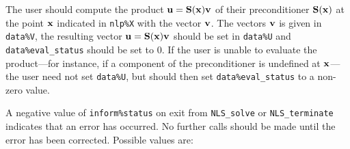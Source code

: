 \documentclass{galahad}
\newcommand{\packagename}{NLS}
\begin{document}
\begin{description}
 The user should compute the product ${\mathbf{u}} = {\mathbf{S}}({\mathbf{x}}){\mathbf{v}}$
     of their preconditioner ${\mathbf{S}}({\mathbf{x}})$ at the point ${\mathbf{x}}$
     indicated in {\tt nlp\%X} with the vector ${\mathbf{v}}$.
     The vectors ${\mathbf{v}}$ is given in {\tt data\%V}, the
     resulting vector ${\mathbf{u}} = {\mathbf{S}}({\mathbf{x}}){\mathbf{v}}$ should be set in {\tt data\%U}
     and {\tt data\%eval\_status}
     should be set to 0. If the user is unable to evaluate the product---for
     instance, if a component of the preconditioner is undefined at
     ${\mathbf{x}}$---the user need not set {\tt data\%U}, but should then set
     {\tt data\%eval\_status} to a non-zero value.
\end{description}



\galerrors
A negative value of {\tt inform\%status} on exit from
{\tt \packagename\_solve}
or
{\tt \packagename\_terminate}
indicates that an error has occurred. No further calls should be made
until the error has been corrected. Possible values are:
\end{document}
